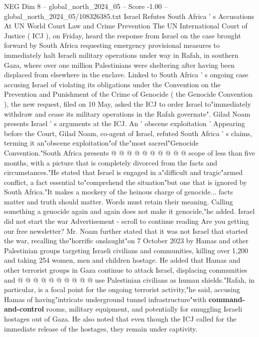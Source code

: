 \begin{textsample}{NEG Dim 8 – global\_north\_2024\_05 – Score -1.00 – global\_north\_2024\_05/108326385.txt}  \label{ex:f8_neg_381}
Israel Refutes South Africa ' s Accusations At UN World Court Law and Crime Prevention The UN International Court of Justice ( ICJ ), on Friday, heard the response from Israel on the case brought forward by South Africa requesting emergency provisional measures to immediately halt Israeli military operations under way in Rafah, in southern Gaza, where over one million Palestinians were sheltering after having been displaced from elsewhere in the enclave.
Linked to South Africa ' s ongoing case accusing Israel of violating its obligations under the Convention on the Prevention and Punishment of the Crime of Genocide ( the Genocide Convention ), the new request, filed on 10 May, asked the ICJ to order Israel to"immediately withdraw and cease its military operations in the Rafah governate".
Gilad Noam presents Israel ' s arguments at the ICJ.
An ' obscene exploitation ' Appearing before the Court, Gilad Noam, co-agent of Israel, refuted South Africa ' s claims, terming it an"obscene exploitation"of the"most sacred"Genocide Convention."South Africa presents @ @ @ @ @ @ @ @ @ @ scope of less than five months, with a picture that is completely divorced from the facts and circumstances."He stated that Israel is engaged in a"difficult and tragic"armed conflict, a fact essential to"comprehend the situation"but one that is ignored by South Africa."It makes a mockery of the heinous charge of genocide... facts matter and truth should matter.
Words must retain their meaning.
Calling something a genocide again and again does not make it genocide,"he added.
Israel did not start the war Advertisement - scroll to continue reading Are you getting our free newsletter?
Mr.
Noam further stated that it was not Israel that started the war, recalling the"horrific onslaught"on 7 October 2023 by Hamas and other Palestinian groups targeting Israeli civilians and communities, killing over 1,200 and taking 254 women, men and children hostage.
He added that Hamas and other terrorist groups in Gaza continue to attack Israel, displacing communities and @ @ @ @ @ @ @ @ @ @ use Palestinian civilians as human shields."Rafah, in particular, is a focal point for the ongoing terrorist activity,"he said, accusing Hamas of having"intricate underground tunnel infrastructure"with \textbf{command-and-control} rooms, military equipment, and potentially for smuggling Israeli hostages out of Gaza.
He also noted that even though the ICJ called for the immediate release of the hostages, they remain under captivity.

\end{textsample}
